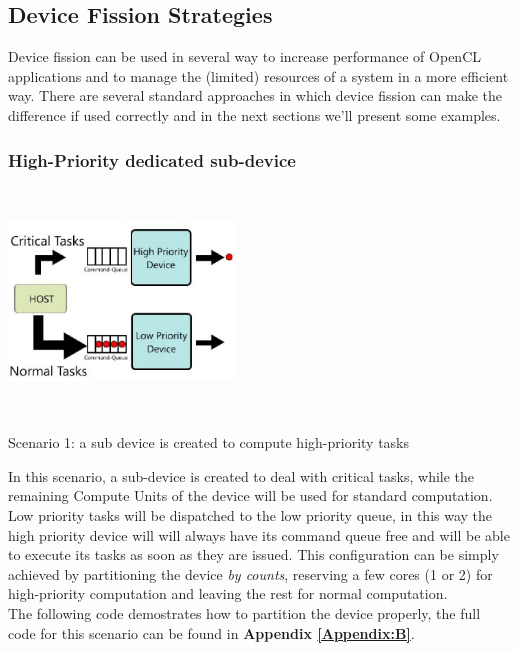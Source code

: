 \subsection{Device Fission Strategies}
Device fission can be used in several way to increase performance of OpenCL applications and to manage the (limited) resources of a system in a more efficient way. There are several standard approaches in which device fission can make the difference if used correctly and in the next sections we'll present some examples.

\subsubsection{High-Priority dedicated sub-device} \label{sect:highPriority}
\begin{figurehere}
 \centering
 \includegraphics[width=6cm, height=6cm]{./eps/HighPriority.eps}
 \caption{Scenario 1: a sub device is created to compute high-priority tasks}
 \label{fig:highPriority}
\end{figurehere}

In this scenario, a sub-device is created to deal with critical tasks, while the remaining Compute Units of the device will be used for standard computation. Low priority tasks will be dispatched to the low priority queue, in this way the high priority device will will always have its command queue free and will be able to execute its tasks as soon as they are issued.
This configuration can be simply achieved by partitioning the device \textit{by counts}, reserving a few cores (1 or 2) for high-priority computation and leaving the rest for normal computation.\\
The following code demostrates how to partition the device properly, the full code for this scenario can be found in \textbf{Appendix \ref{Appendix:B}}.


